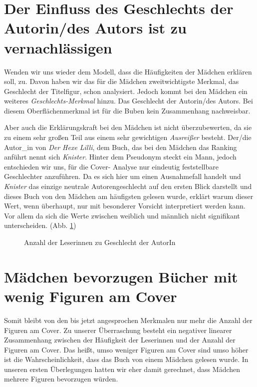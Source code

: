 \section{Der Einfluss des Geschlechts der Autorin/des Autors ist zu
vernachlässigen}

Wenden wir uns wieder dem Modell, dass die Häufigkeiten der Mädchen
erklären soll, zu. Davon haben wir das für die Mädchen zweitwichtigste
Merkmal, das Geschlecht der Titelfigur, schon analysiert. Jedoch kommt
bei den Mädchen ein weiteres \emph{Geschlechts-Merkmal} hinzu. Das
Geschlecht der Autorin/des Autors. Bei diesem Oberflächenmerkmal ist für
die Buben kein Zusammenhang nachweisbar.

Aber auch die Erklärungskraft bei den Mädchen ist nicht überzubewerten,
da sie zu einem sehr großen Teil aus einem sehr gewichtigen
\emph{Ausreißer} besteht. Der/die Autor\_in von \emph{Der Hexe Lilli},
dem Buch, das bei den Mädchen das Ranking anführt nennt sich
\emph{Knister}. Hinter dem Pseudonym steckt ein Mann, jedoch entschieden
wir uns, für die Cover- Analyse nur eindeutig feststellbare Geschlechter
anzuführen. Da es sich hier um einen Ausnahmefall handelt und
\emph{Knister} das einzige neutrale Autorengeschlecht auf den ersten
Blick darstellt und dieses Buch von den Mädchen am häufigsten gelesen
wurde, erklärt warum dieser Wert, wenn überhaupt, nur mit besonderer
Vorsicht interpretiert werden kann. Vor allem da sich die Werte zwischen
weiblich und männlich nicht signifikant unterscheiden. (Abb.
\ref{maedchen-geschlecht})

\begin{figure}
\center
  \vspace{-1.5cm}

  \caption[Leserinnen--Geschlecht]{Anzahl der Leserinnen zu Geschlecht der AutorIn}
  \label{maedchen-geschlecht}

\end{figure}

\section{Mädchen bevorzugen Bücher mit wenig Figuren am Cover}

Somit bleibt von den bis jetzt angesprochen Merkmalen nur mehr die
Anzahl der Figuren am Cover. Zu unserer Überraschung besteht ein
negativer linearer Zusammenhang zwischen der Häufigkeit der Leserinnen
und der Anzahl der Figuren am Cover. Das heißt, umso weniger Figuren am
Cover sind umso höher ist die Wahrscheinlichkeit, dass das Buch von
einem Mädchen gelesen wurde. In unseren ersten Überlegungen hatten wir
eher damit gerechnet, dass Mädchen mehrere Figuren bevorzugen würden.

